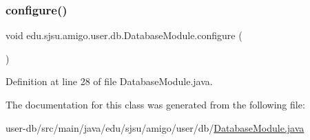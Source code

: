 \subsubsection{\texorpdfstring{configure()}{configure()}}
{\footnotesize\ttfamily void edu.\+sjsu.\+amigo.\+user.\+db.\+Database\+Module.\+configure (\begin{DoxyParamCaption}{ }\end{DoxyParamCaption})}



Definition at line 28 of file Database\+Module.\+java.



The documentation for this class was generated from the following file\+:\begin{DoxyCompactItemize}
\item 
user-\/db/src/main/java/edu/sjsu/amigo/user/db/\hyperlink{_database_module_8java}{Database\+Module.\+java}\end{DoxyCompactItemize}
